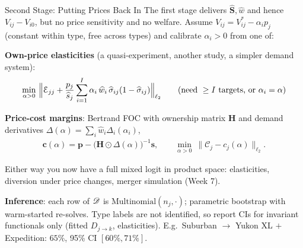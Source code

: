 \documentclass[aspectratio=169,10pt]{beamer}
\begin{document}
\begin{frame}{Second Stage: Putting Prices Back In}
\small
The first stage delivers $\widehat{\symbf{S}}, \widehat{w}$ and hence $V_{ij} - V_{i0}$, but no price sensitivity and no welfare. Assume $V_{ij} = V^{*}_{ij} - \alpha_i p_j$ (constant within type, free across types) and calibrate $\alpha_i > 0$ from one of:
\vspace{-0.15cm}
\begin{wideitemize}
\item \textbf{Own-price elasticities} (a quasi-experiment, another study, a simpler demand system):
\begin{align*}
\min_{\alpha > 0}\ \Bigl\| \mathcal{E}_{jj} + \frac{p_j}{\widehat{s}_j} \sum_{i=1}^I \alpha_i\, \widehat{w}_i\, \widehat{\sigma}_{ij} (1-\widehat{\sigma}_{ij}) \Bigr\|_{\ell_2}
\qquad \text{(need } \geq I \text{ targets, or } \alpha_i = \alpha \text{)}
\end{align*}
\item \textbf{Price-cost margins}: Bertrand FOC with ownership matrix $\symbf{H}$ and demand derivatives $\Delta(\alpha) = \sum_i \widehat{w}_i \Delta_i(\alpha_i)$,
\begin{align*}
\symbf{c}(\alpha) = \symbf{p} - \bigl(\symbf{H} \odot \Delta(\alpha)\bigr)^{-1} \symbf{s},
\qquad
\min_{\alpha > 0}\ \bigl\| \mathcal{C}_j - c_j(\alpha) \bigr\|_{\ell_2}.
\end{align*}
\item Either way you now have a full mixed logit in product space: elasticities, diversion under price changes, merger simulation (Week 7).
\item \textbf{Inference}: each row of $\mathscr{D}$ is $\text{Multinomial}(n_j, \cdot)$; parametric bootstrap with warm-started re-solves. Type labels are not identified, so report CIs for \alert{invariant functionals} only (fitted $D_{j\rightarrow k}$, elasticities). E.g.\ Suburban $\rightarrow$ Yukon XL $+$ Expedition: $65\%$, 95\% CI $[60\%, 71\%]$.
\end{wideitemize}
\end{frame}
\end{document}
